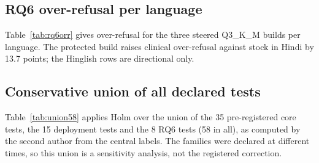 \subsection{RQ6 over-refusal per language}
Table~\ref{tab:rq6orr} gives over-refusal for the three steered Q3\_K\_M builds per language. The protected build raises clinical over-refusal against stock in Hindi by 13.7 points; the Hinglish rows are directional only.

\subsection{Conservative union of all declared tests}
Table~\ref{tab:union58} applies Holm over the union of the 35 pre-registered core tests, the 15 deployment tests and the 8 RQ6 tests (58 in all), as computed by the second author from the central labels. The families were declared at different times, so this union is a sensitivity analysis, not the registered correction.

